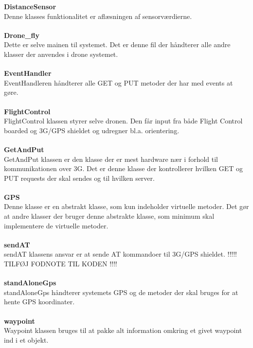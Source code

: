 \textbf{DistanceSensor}\\
Denne klasses funktionalitet er aflæsningen af sensorværdierne. \\ \\

\textbf{Drone\_fly}\\
Dette er selve mainen til systemet. Det er denne fil der håndterer alle andre klasser der anvendes i drone systemet. \\ \\

\textbf{EventHandler}\\
EventHandleren håndterer alle GET og PUT metoder der har med events at gøre. \\ \\

\textbf{FlightControl}\\
FlightControl klassen styrer selve dronen. Den får input fra både Flight Control boarded og 3G/GPS shieldet og udregner bl.a. orientering. \\ \\

\textbf{GetAndPut}\\
GetAndPut klassen er den klasse der er mest hardware nær i forhold til kommunikationen over 3G. Det er denne klasse der kontrollerer hvilken GET og PUT requests der skal sendes og til hvilken server. \\ \\ 

\textbf{GPS}\\
Denne klasse er en abstrakt klasse, som kun indeholder virtuelle metoder. Det gør at andre klasser der bruger denne abstrakte klasse, som minimum skal implementere de virtuelle metoder. \\ \\

\textbf{sendAT}\\
sendAT klassens ansvar er at sende AT kommandoer til 3G/GPS shieldet. !!!!! TILFØJ FODNOTE TIL KODEN !!!!\\ \\ 

\textbf{standAloneGps}\\
standAloneGps håndterer systemets GPS og de metoder der skal bruges for at hente GPS koordinater. \\ \\

\textbf{waypoint}\\
Waypoint klassen bruges til at pakke alt information omkring et givet waypoint ind i et objekt.\\ \\


